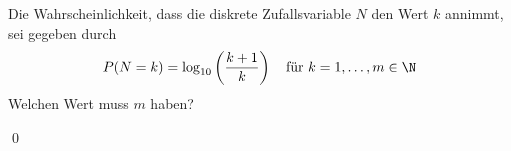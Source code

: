 \documentclass{abgabe}
\begin{document}
\begin{questions}
    \question
    Die Wahrscheinlichkeit, dass die diskrete Zufallsvariable $N$ den Wert $k$ annimmt, sei gegeben durch
    \[ 
        P(N=k) = \log_{10}\left( \frac{k+1}{k} \right) \quad \text{für} \ k = 1, \ldots, m \in \N 
    \]
    Welchen Wert muss $m$ haben? 
    \begin{solution}

        \qed
    \end{solution}
\end{questions}
\end{document}
